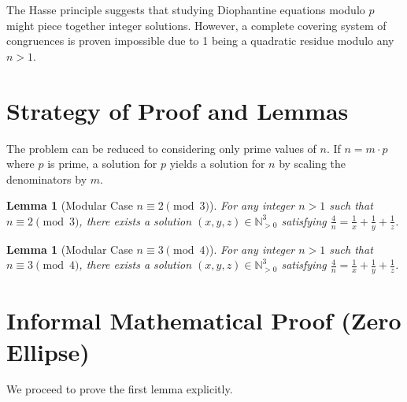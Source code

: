 \documentclass[11pt,a4paper]{article}
\newtheorem{lemma}[theorem]{Lemma}
\begin{document}
The Hasse principle suggests that studying Diophantine equations modulo $p$ might piece together integer solutions. However, a complete covering system of congruences is proven impossible due to 1 being a quadratic residue modulo any $n > 1$.

\section{Strategy of Proof and Lemmas}

The problem can be reduced to considering only prime values of $n$. If $n = m \cdot p$ where $p$ is prime, a solution for $p$ yields a solution for $n$ by scaling the denominators by $m$.

\begin{lemma}[Modular Case $n \equiv 2 \pmod 3$]
For any integer $n > 1$ such that $n \equiv 2 \pmod 3$, there exists a solution $(x,y,z) \in \mathbb{N}_{>0}^3$ satisfying $\frac{4}{n} = \frac{1}{x} + \frac{1}{y} + \frac{1}{z}$.
\end{lemma}

\begin{lemma}[Modular Case $n \equiv 3 \pmod 4$]
For any integer $n > 1$ such that $n \equiv 3 \pmod 4$, there exists a solution $(x,y,z) \in \mathbb{N}_{>0}^3$ satisfying $\frac{4}{n} = \frac{1}{x} + \frac{1}{y} + \frac{1}{z}$.
\end{lemma}

\section{Informal Mathematical Proof (Zero Ellipse)}

We proceed to prove the first lemma explicitly.
\end{document}

